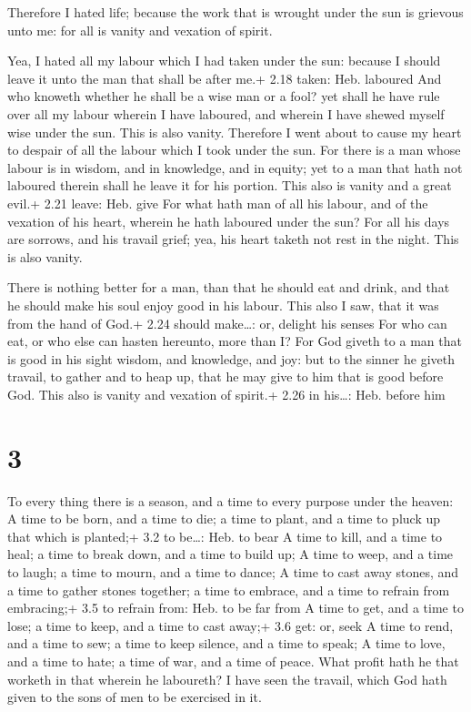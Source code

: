  Therefore I hated life; because the work that is wrought
under the sun is grievous unto me: for all is vanity and vexation of
spirit.

 Yea, I hated all my labour which I had taken under the
sun: because I should leave it unto the man that shall be after me.+
2.18 taken: Heb. laboured  And who knoweth whether he shall
be a wise man or a fool? yet shall he have rule over all my labour
wherein I have laboured, and wherein I have shewed myself wise under the
sun. This is also vanity.  Therefore I went about to cause
my heart to despair of all the labour which I took under the sun.
 For there is a man whose labour is in wisdom, and in
knowledge, and in equity; yet to a man that hath not laboured therein
shall he leave it for his portion. This also is vanity and a great
evil.+ 2.21 leave: Heb. give  For what hath man of all his
labour, and of the vexation of his heart, wherein he hath laboured under
the sun?  For all his days are sorrows, and his travail
grief; yea, his heart taketh not rest in the night. This is also vanity.

 There is nothing better for a man, than that he should
eat and drink, and that he should make his soul enjoy good in his
labour. This also I saw, that it was from the hand of God.+ 2.24 should
make\ldots: or, delight his senses  For who can eat, or who
else can hasten hereunto, more than I?  For God giveth to a
man that is good in his sight wisdom, and knowledge, and joy: but to the
sinner he giveth travail, to gather and to heap up, that he may give to
him that is good before God. This also is vanity and vexation of
spirit.+ 2.26 in his\ldots: Heb. before him

\hypertarget{section-2}{%
\section{3}\label{section-2}}

 To every thing there is a season, and a time to every
purpose under the heaven:  A time to be born, and a time to
die; a time to plant, and a time to pluck up that which is planted;+ 3.2
to be\ldots: Heb. to bear  A time to kill, and a time to
heal; a time to break down, and a time to build up;  A time
to weep, and a time to laugh; a time to mourn, and a time to dance;
 A time to cast away stones, and a time to gather stones
together; a time to embrace, and a time to refrain from embracing;+ 3.5
to refrain from: Heb. to be far from  A time to get, and a
time to lose; a time to keep, and a time to cast away;+ 3.6 get: or,
seek  A time to rend, and a time to sew; a time to keep
silence, and a time to speak;  A time to love, and a time to
hate; a time of war, and a time of peace.  What profit hath
he that worketh in that wherein he laboureth?  I have seen
the travail, which God hath given to the sons of men to be exercised in
it.


